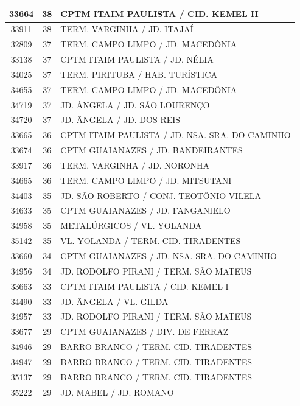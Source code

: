 \documentclass[
	12pt,				%
	oneside,			%
	a4paper,			%
	english,			%
	brazil				%
	]{abntex2ppgsi}
\begin{document}
{{{\begin{apendicesenv}
\begin{longtable}{c|c|p{7cm}}
 \hline 
33664 &	38 &	CPTM ITAIM PAULISTA / CID. KEMEL II \\ 
 \hline 
33911 &	38 &	TERM. VARGINHA / JD. ITAJAÍ \\ 
 \hline 
32809 &	37 &	TERM. CAMPO LIMPO / JD. MACEDÔNIA \\ 
 \hline 
33138 &	37 &	CPTM ITAIM PAULISTA / JD. NÉLIA \\ 
 \hline 
34025 &	37 &	TERM. PIRITUBA / HAB. TURÍSTICA \\ 
 \hline 
34655 &	37 &	TERM. CAMPO LIMPO / JD. MACEDÔNIA \\ 
 \hline 
34719 &	37 &	JD. ÂNGELA / JD. SÃO LOURENÇO \\ 
 \hline 
34720 &	37 &	JD. ÂNGELA / JD. DOS REIS \\ 
 \hline 
33665 &	36 &	CPTM ITAIM PAULISTA / JD. NSA. SRA. DO CAMINHO \\ 
 \hline 
33674 &	36 &	CPTM GUAIANAZES / JD. BANDEIRANTES \\ 
 \hline 
33917 &	36 &	TERM. VARGINHA / JD. NORONHA \\ 
 \hline 
34665 &	36 &	TERM. CAMPO LIMPO / JD. MITSUTANI \\ 
 \hline 
34403 &	35 &	JD. SÃO ROBERTO / CONJ. TEOTÔNIO VILELA \\ 
 \hline 
34633 &	35 &	CPTM GUAIANAZES / JD. FANGANIELO \\ 
 \hline 
34958 &	35 &	METALÚRGICOS / VL. YOLANDA \\ 
 \hline 
35142 &	35 &	VL. YOLANDA / TERM. CID. TIRADENTES \\ 
 \hline 
33660 &	34 &	CPTM GUAIANAZES / JD. NSA. SRA. DO CAMINHO \\ 
 \hline 
34956 &	34 &	JD. RODOLFO PIRANI / TERM. SÃO MATEUS \\ 
 \hline 
33663 &	33 &	CPTM ITAIM PAULISTA / CID. KEMEL I \\ 
 \hline 
34490 &	33 &	JD. ÂNGELA / VL. GILDA \\ 
 \hline 
34957 &	33 &	JD. RODOLFO PIRANI / TERM. SÃO MATEUS \\ 
 \hline 
33677 &	29 &	CPTM GUAIANAZES / DIV. DE FERRAZ \\ 
 \hline 
34946 &	29 &	BARRO BRANCO / TERM. CID. TIRADENTES \\ 
 \hline 
34947 &	29 &	BARRO BRANCO / TERM. CID. TIRADENTES \\ 
 \hline 
35137 &	29 &	BARRO BRANCO / TERM. CID. TIRADENTES \\ 
 \hline 
35222 &	29 &	JD. MABEL / JD. ROMANO \\ 
 \hline 

\end{longtable}
\end{apendicesenv}}}}
\end{document}
